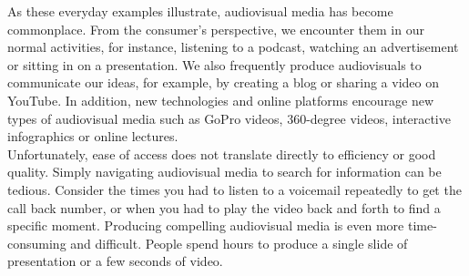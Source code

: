 As these everyday examples illustrate, audiovisual media has become commonplace. From the consumer's perspective, we encounter them in our normal activities, for instance, listening to a podcast, watching an advertisement or sitting in on a presentation. We also frequently produce audiovisuals to communicate our ideas, for example, by creating a blog or sharing a video on YouTube. In addition, new technologies and online platforms encourage new types of audiovisual media such as GoPro videos, 360-degree videos, interactive infographics or online lectures.\\ 

Unfortunately, ease of access does not translate directly to efficiency or good quality. Simply navigating audiovisual media to search for information can be tedious. Consider the times you had to listen to a voicemail repeatedly to get the call back number, or when you had to play the video back and forth to find a specific moment. Producing compelling audiovisual media is even more time-consuming and difficult. People spend hours to produce a single slide of presentation or a few seconds of video.\\ 

